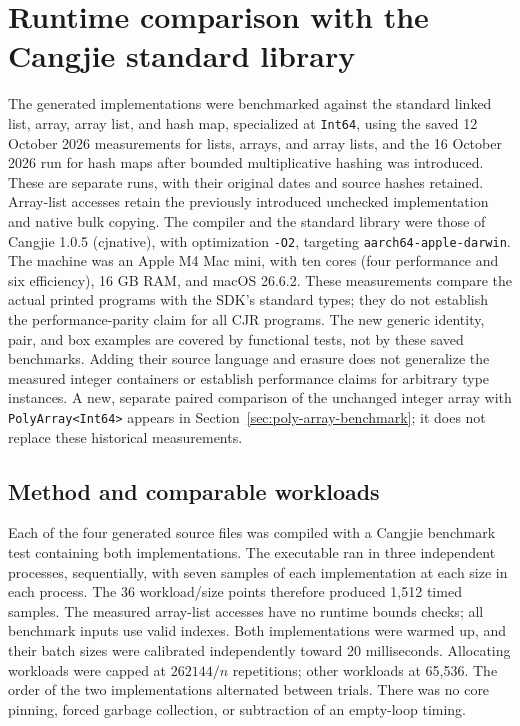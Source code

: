 \section{Runtime comparison with the Cangjie standard library}
\label{sec:benchmarks}

The generated implementations were benchmarked against the standard
linked list, array, array list, and hash map, specialized at \texttt{Int64},
using the saved 12 October 2026 measurements for lists, arrays, and
array lists, and the 16 October 2026 run for hash maps after bounded
multiplicative hashing was introduced. These are separate runs, with their
original dates and source hashes retained. Array-list accesses retain the
previously introduced unchecked implementation and native bulk copying.
The compiler and the standard library were those of Cangjie 1.0.5 (cjnative),
with optimization \texttt{-O2}, targeting \texttt{aarch64-apple-darwin}.
The machine was an Apple M4 Mac mini, with ten cores (four performance and
six efficiency), 16 GB RAM, and macOS 26.6.2.  These measurements compare
the actual printed programs with the SDK's standard types; they do not
establish the performance-parity claim for all CJR programs.
The new generic identity, pair, and box examples are covered by functional
tests, not by these saved benchmarks. Adding their source language and
erasure does not generalize the measured integer containers or establish
performance claims for arbitrary type instances. A new, separate paired
comparison of the unchanged integer array with \texttt{PolyArray<Int64>}
appears in Section~\ref{sec:poly-array-benchmark}; it does not replace
these historical measurements.

\subsection{Method and comparable workloads}

Each of the four generated source files was compiled with a
Cangjie benchmark test containing both implementations.  The executable
ran in three independent processes, sequentially, with seven samples of
each implementation at each size in each process.  The 36 workload/size
points therefore produced 1,512 timed samples. The measured array-list accesses have no runtime bounds checks; all benchmark inputs use valid indexes.  Both implementations were
warmed up, and their batch sizes were calibrated independently toward
20 milliseconds.  Allocating workloads were capped at $262144/n$
repetitions; other workloads at 65,536.  The order of the two implementations alternated between
trials.  There was no core pinning, forced garbage collection, or subtraction
of an empty-loop timing.

